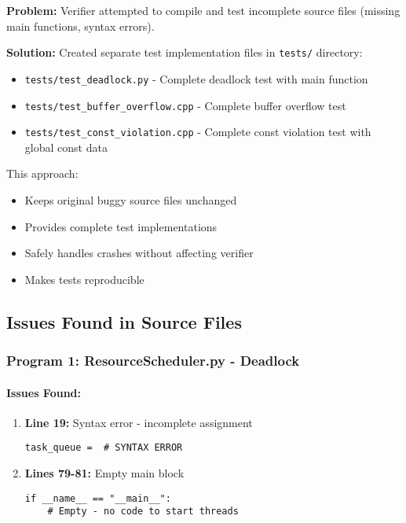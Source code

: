 \documentclass[11pt,a4paper]{article}
\begin{document}
\textbf{Problem:} Verifier attempted to compile and test incomplete source files (missing main functions, syntax errors).

\textbf{Solution:} Created separate test implementation files in \texttt{tests/} directory:
\begin{itemize}
    \item \texttt{tests/test\_deadlock.py} - Complete deadlock test with main function
    \item \texttt{tests/test\_buffer\_overflow.cpp} - Complete buffer overflow test
    \item \texttt{tests/test\_const\_violation.cpp} - Complete const violation test with global const data
\end{itemize}

This approach:
\begin{itemize}
    \item Keeps original buggy source files unchanged
    \item Provides complete test implementations
    \item Safely handles crashes without affecting verifier
    \item Makes tests reproducible
\end{itemize}

\subsection{Issues Found in Source Files}

\subsubsection{Program 1: ResourceScheduler.py - Deadlock}

\paragraph{Issues Found:}

\begin{enumerate}
    \item \textbf{Line 19:} Syntax error - incomplete assignment
\begin{lstlisting}[style=python]
task_queue =  # SYNTAX ERROR
\end{lstlisting}

    \item \textbf{Lines 79-81:} Empty main block
\begin{lstlisting}[style=python]
if __name__ == "__main__":
    # Empty - no code to start threads
\end{lstlisting}
\end{enumerate}
\end{document}
